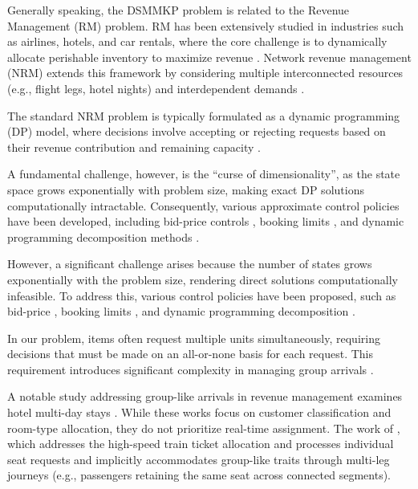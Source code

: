Generally speaking, the DSMMKP problem is related to the Revenue Management (RM) problem. RM has been extensively studied in industries such as airlines, hotels, and car rentals, where the core challenge is to dynamically allocate perishable inventory to maximize revenue \citep{van2005introduction}. Network revenue management (NRM) extends this framework by considering multiple interconnected resources (e.g., flight legs, hotel nights) and interdependent demands \citep{williamson1992airline}.


The standard NRM problem is typically formulated as a dynamic programming (DP) model, where decisions involve accepting or rejecting requests based on their revenue contribution and remaining capacity \citep{talluri1998analysis}. 

A fundamental challenge, however, is the ``curse of dimensionality'', as the state space grows exponentially with problem size, making exact DP solutions computationally intractable. Consequently, various approximate control policies have been developed, including bid-price controls \citep{adelman2007dynamic, bertsimas2003revenue}, booking limits \citep{gallego1997multiproduct}, and dynamic programming decomposition methods \citep{talluri2006theory, liu2008choice}.

However, a significant challenge arises because the number of states grows exponentially with the problem size, rendering direct solutions computationally infeasible. To address this, various control policies have been proposed, such as bid-price \citep{adelman2007dynamic, bertsimas2003revenue}, booking limits \citep{gallego1997multiproduct}, and dynamic programming decomposition \citep{talluri2006theory, liu2008choice}. 


In our problem, items often request multiple units simultaneously, requiring decisions that must be made on an all-or-none basis for each request. This requirement introduces significant complexity in managing group arrivals \citep{talluri2006theory}.

A notable study addressing group-like arrivals in revenue management examines hotel multi-day stays \citep{bitran1995application, goldman2002models, aydin2018decomposition}. While these works focus on customer classification and room-type allocation, they do not prioritize real-time assignment. The work of \cite{zhu2023assign}, which addresses the high-speed train ticket allocation and processes individual seat requests and implicitly accommodates group-like traits through multi-leg journeys (e.g., passengers retaining the same seat across connected segments).